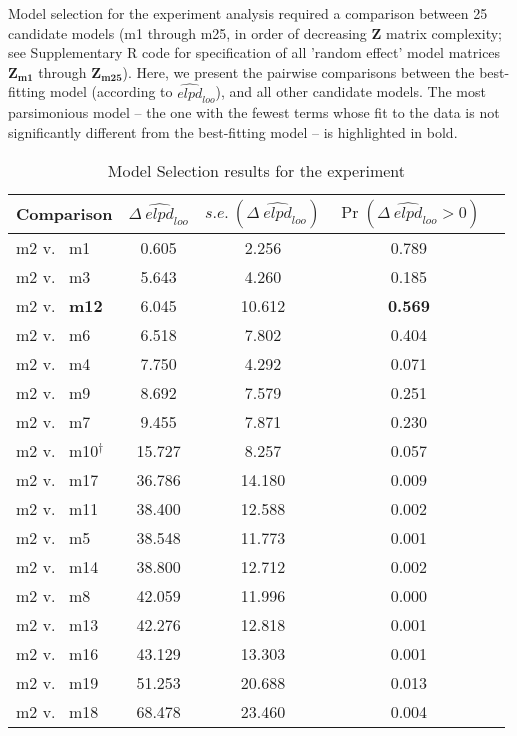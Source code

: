 \documentclass{article}
\begin{document}
\newpage{}

\noindent Model selection for the  experiment analysis required a comparison between 25 candidate models (m1 through m25, in order of decreasing $\mathbf{Z}$ matrix complexity; see Supplementary R code for specification of all 'random effect' model matrices $\mathbf{Z_{m1}}$ through $\mathbf{Z_{m25}}$). Here, we present the pairwise comparisons between the best-fitting model (according to $\widehat{\textit{elpd}}_{\textit{loo}}$), and all other candidate models. The most parsimonious model -- the one with the fewest terms whose fit to the data is not significantly different from the best-fitting model -- is highlighted in bold.


\begin{table}[!ht]
\caption{Model Selection results for the  experiment}
\label{Table:Exp2ModComp}
\centering
\begin{tabular}{l c c c c} \hline
Comparison & $\Delta~\widehat{\textit{elpd}}_{\textit{loo}}$ & $s.e.~(\Delta~\widehat{\textit{elpd}}_{\textit{loo}})$ & $\Pr(\Delta~\widehat{\textit{elpd}}_{\textit{loo}} > 0)$ \\
\hline
m2 v.~ m1  & 0.605   & 2.256  & 0.789 \\
m2 v.~ m3  & 5.643   & 4.260  & 0.185 \\
m2 v.~ \textbf{m12} & 6.045   & 10.612 & \textbf{0.569} \\
m2 v.~ m6  & 6.518   & 7.802  & 0.404 \\
m2 v.~ m4  & 7.750   & 4.292  & 0.071 \\
m2 v.~ m9  & 8.692   & 7.579  & 0.251 \\
m2 v.~ m7  & 9.455   & 7.871  & 0.230 \\
m2 v.~ m10$^\dagger$ & 15.727  & 8.257  & 0.057 \\
m2 v.~ m17 & 36.786  & 14.180 & 0.009 \\
m2 v.~ m11 & 38.400  & 12.588 & 0.002 \\
m2 v.~ m5  & 38.548  & 11.773 & 0.001 \\
m2 v.~ m14 & 38.800  & 12.712 & 0.002 \\
m2 v.~ m8  & 42.059  & 11.996 & 0.000 \\
m2 v.~ m13 & 42.276  & 12.818 & 0.001 \\
m2 v.~ m16 & 43.129  & 13.303 & 0.001 \\
m2 v.~ m19 & 51.253  & 20.688 & 0.013 \\
m2 v.~ m18 & 68.478  & 23.460 & 0.004 \\

\end{tabular}
\end{table}
\end{document}
